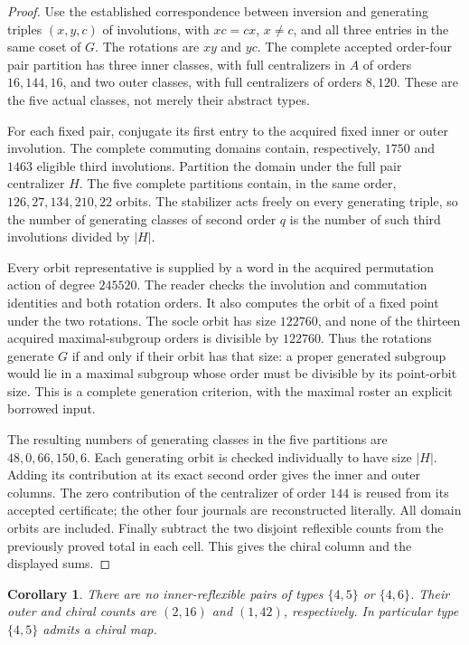 \documentclass[11pt]{article}
\newtheorem{corollary}[theorem]{Corollary}
\begin{document}
\begin{proof}
Use the established correspondence between inversion and generating
triples $(x,y,c)$ of involutions, with $xc=cx$, $x\ne c$, and all three
entries in the same coset of $G$. The rotations are $xy$ and $yc$.
The complete accepted order-four pair partition has three inner
classes, with full centralizers in $A$ of orders $16,144,16$, and two
outer classes, with full centralizers of orders $8,120$.
These are the five actual classes, not merely their abstract types.

For each fixed pair, conjugate its first entry to the acquired fixed
inner or outer involution. The complete commuting domains contain,
respectively, $1750$ and $1463$ eligible third involutions. Partition
the domain under the full pair centralizer $H$. The five complete
partitions contain, in the same order, $126,27,134,210,22$ orbits.
The stabilizer acts freely on every generating triple, so the number
of generating classes of second order $q$ is the number of such
third involutions divided by $|H|$.

Every orbit representative is supplied by a word in the acquired
permutation action of degree $245520$. The reader checks the involution
and commutation identities and both rotation orders. It also computes
the orbit of a fixed point under the two rotations. The socle orbit
has size $122760$, and none of the thirteen acquired maximal-subgroup
orders is divisible by $122760$. Thus the rotations generate $G$
if and only if their orbit has that size: a proper generated subgroup
would lie in a maximal subgroup whose order must be divisible by its
point-orbit size. This is a complete generation criterion, with the
maximal roster an explicit borrowed input.

The resulting numbers of generating classes in the five partitions
are $48,0,66,150,6$. Each generating orbit is checked individually to
have size $|H|$. Adding its contribution at its exact second order
gives the inner and outer columns. The zero contribution of the
centralizer of order $144$ is reused from its accepted certificate;
the other four journals are reconstructed literally. All domain
orbits are included. Finally subtract the two disjoint reflexible
counts from the previously proved total in each cell. This gives the
chiral column and the displayed sums.
\end{proof}

\begin{corollary}
There are no inner-reflexible pairs of types $\{4,5\}$ or $\{4,6\}$.
Their outer and chiral counts are $(2,16)$ and $(1,42)$, respectively.
In particular type $\{4,5\}$ admits a chiral map.
\end{corollary}
\end{document}
